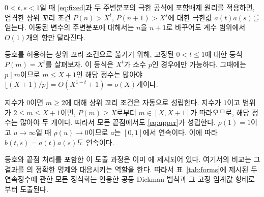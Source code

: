 \documentclass[11pt,a4paper]{amsart}
\theoremstyle{korplain}
\begin{document}
$0<t,s<1$일 때 \eqref{eq:fixed}과 두 주변분포의 극한 공식에 포함배제 원리를
적용하면, 엄격한 상위 꼬리 조건 $P(n)>X^t$, $P(n+1)>X^s$에 대한
극한값 $a(t)a(s)$를 얻는다.
이동된 변수의 주변분포에 대해서는 $n$을 $n+1$로 바꾸어도
계수 범위에서 $O(1)$개의 항만 달라진다.

등호를 허용하는 상위 꼬리 조건으로 옮기기 위해,
고정된 $0<t\le1$에 대한 등식 $P(m)=X^t$를 살펴보자.
이 등식은 $X^t$가 소수 $p$인 경우에만 가능하다.
그때에는 $p\mid m$이므로 $m\le X+1$인 해당 정수는 많아야
$\lfloor(X+1)/p\rfloor=O(X^{1-t}+1)=o(X)$개이다.

지수가 $0$이면 $m\ge2$에 대해 상위 꼬리 조건은 자동으로 성립한다.
지수가 $1$이고 범위가 $2\le m\le X+1$이면,
$P(m)\ge X$로부터 $m\in[X,X+1]$가 따라오므로,
해당 정수는 많아야 두 개이다. 따라서 모든 끝점에서도 \eqref{eq:upper}가 성립한다.
$\rho(1)=1$이고 $u\to\infty$일 때 $\rho(u)\to0$이므로
$a$는 $[0,1]$에서 연속이다. 이에 따라 $b(t,s)=a(t)a(s)$도 연속이다.

등호와 끝점 처리를 포함한 이 도출 과정은 이미
\cite[(11.8)과 그다음 문단, 80쪽]{OpenAI2026}에 제시되어 있다.
여기서의 비교는 그 결과를 \cite{ErdosPomerance1978}의 정확한 명제와 대응시키는 역할을 한다.
따라서 표~\ref{tab:forms}에 제시된 두 연속정수에 관한 모든 정식화는
인용한 공동 Dickman 법칙과 그 고정 임계값 형태로부터 도출된다.
\end{document}
